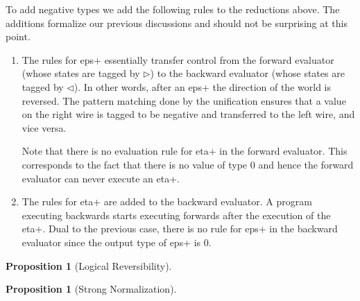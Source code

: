 \documentclass[preprint]{sigplanconf}
\newtheorem{proposition}[theorem]{Proposition}
\begin{document}
To add negative types we add the following rules to the
  reductions above. The additions formalize our previous discussions
  and should not be surprising at this point.

  \begin{enumerate}
  \item The rules for {{eps+}} essentially transfer control from the
    forward evaluator (whose states are tagged by $\triangleright$) to
    the backward evaluator (whose states are tagged by
    $\triangleleft$). In other words, after an {{eps+}} the direction
    of the world is reversed. The pattern matching done by the
    unification ensures that a value on the {{right}} wire is tagged
    to be negative and transferred to the {{left}} wire, and vice versa.


    Note that there is no evaluation rule for {{eta+}} in the forward
    evaluator. This corresponds to the fact that there is no value of
    type {{0}} and hence the forward evaluator can never execute an
    {{eta+}}.

    \item The rules for {{eta+}} are added to the backward evaluator. A
      program executing backwards starts executing forwards after the
      execution of the {{eta+}}. Dual to the previous case, there is
      no rule for {{eps+}} in the backward evaluator since the output
      type of {{eps+}} is {{0}}.


  \end{enumerate}


\begin{proposition}[Logical Reversibility]
  
\end{proposition}

\begin{proposition}[Strong Normalization]
  
\end{proposition}
\end{document}
